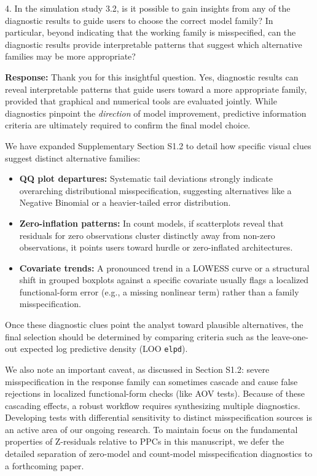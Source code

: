 \documentclass[11pt]{article}
\newcommand*{\mybox}[2]{%
  \par\medskip\noindent
  \colorbox{#1!30}{\parbox{.98\linewidth}{#2}}%
  \par\medskip
}
\begin{document}
\mybox{gray}{4. In the simulation study 3.2, is it possible to gain insights from any of the diagnostic results to guide users to choose the correct model family? In particular, beyond indicating that the working family is misspecified, can the diagnostic results provide interpretable patterns that suggest which alternative families may be more appropriate?}

\textbf{Response:} 
Thank you for this insightful question. Yes, diagnostic results can reveal interpretable patterns that guide users toward a more appropriate family, provided that graphical and numerical tools are evaluated jointly. While diagnostics pinpoint the \emph{direction} of model improvement, predictive information criteria are ultimately required to confirm the final model choice.

We have expanded Supplementary Section S1.2 to detail how specific visual clues suggest distinct alternative families:
\begin{itemize}
    \item \textbf{QQ plot departures:} Systematic tail deviations strongly indicate overarching distributional misspecification, suggesting alternatives like a Negative Binomial or a heavier-tailed error distribution.
    \item \textbf{Zero-inflation patterns:} In count models, if scatterplots reveal that residuals for zero observations cluster distinctly away from non-zero observations, it points users toward hurdle or zero-inflated architectures.
    \item \textbf{Covariate trends:} A pronounced trend in a LOWESS curve or a structural shift in grouped boxplots against a specific covariate usually flags a localized functional-form error (e.g., a missing nonlinear term) rather than a family misspecification.
\end{itemize}

Once these diagnostic clues point the analyst toward plausible alternatives, the final selection should be determined by comparing criteria such as the leave-one-out expected log predictive density (LOO \texttt{elpd}).

We also note an important caveat, as discussed in Section S1.2: severe misspecification in the response family can sometimes cascade and cause false rejections in localized functional-form checks (like AOV tests). Because of these cascading effects, a robust workflow requires synthesizing multiple diagnostics. Developing tests with differential sensitivity to distinct misspecification sources is an active area of our ongoing research. To maintain focus on the fundamental properties of Z-residuals relative to PPCs in this manuscript, we defer the detailed separation of zero-model and count-model misspecification diagnostics to a forthcoming paper.
\end{document}
